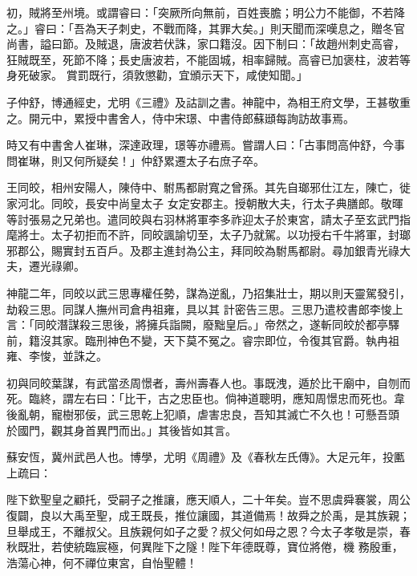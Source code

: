 \begin{pinyinscope}
 初，賊將至州境。或謂睿曰：「突厥所向無前，百姓喪膽；明公力不能御，不若降之。」睿曰：「吾為天子刺史，不戰而降，其罪大矣。」則天聞而深嘆息之，贈冬官尚書，謚曰節。及賊退，唐波若伏誅，家口籍沒。因下制曰：「故趙州刺史高睿，狂賊既至，死節不降；長史唐波若，不能固城，相率歸賊。高睿已加褒柱，波若等身死破家。
 賞罰既行，須敦懲勸，宜頒示天下，咸使知聞。」



 子仲舒，博通經史，尤明《三禮》及詁訓之書。神龍中，為相王府文學，王甚敬重之。開元中，累授中書舍人，侍中宋璟、中書侍郎蘇頲每詢訪故事焉。



 時又有中書舍人崔琳，深達政理，璟等亦禮焉。嘗謂人曰：「古事問高仲舒，今事問崔琳，則又何所疑矣！」仲舒累遷太子右庶子卒。



 王同皎，相州安陽人，陳侍中、駙馬都尉寬之曾孫。其先自瑯邪仕江左，陳亡，徙家河北。同皎，長安中尚皇太子
 女定安郡主。授朝散大夫，行太子典膳郎。敬暉等討張易之兄弟也。遣同皎與右羽林將軍李多祚迎太子於東宮，請太子至玄武門指麾將士。太子初拒而不許，同皎諷諭切至，太子乃就駕。以功授右千牛將軍，封瑯邪郡公，賜實封五百戶。及郡主進封為公主，拜同皎為駙馬都尉。尋加銀青光祿大夫，遷光祿卿。



 神龍二年，同皎以武三思專權任勢，謀為逆亂，乃招集壯士，期以則天靈駕發引，劫殺三思。同謀人撫州司倉冉祖雍，具以其
 計密告三思。三思乃遣校書郎李悛上言：「同皎潛謀殺三思後，將擁兵詣闕，廢黜皇后。」帝然之，遂斬同皎於都亭驛前，籍沒其家。臨刑神色不變，天下莫不冤之。睿宗即位，令復其官爵。執冉祖雍、李悛，並誅之。



 初與同皎葉謀，有武當丞周憬者，壽州壽春人也。事既洩，遁於比干廟中，自刎而死。臨終，謂左右曰：「比干，古之忠臣也。倘神道聰明，應知周憬忠而死也。韋後亂朝，寵樹邪佞，武三思乾上犯順，虐害忠良，吾知其滅亡不久也！可懸吾頭
 於國門，觀其身首異門而出。」其後皆如其言。



 蘇安恆，冀州武邑人也。博學，尤明《周禮》及《春秋左氏傳》。大足元年，投匭上疏曰：



 陛下欽聖皇之顧托，受嗣子之推讓，應天順人，二十年矣。豈不思虞舜褰裳，周公復闢，良以大禹至聖，成王既長，推位讓國，其道備焉！故舜之於禹，是其族親；旦舉成王，不離叔父。且族親何如子之愛？叔父何如母之恩？今太子孝敬是崇，春秋既壯，若使統臨宸極，何異陛下之隧！陛下年德既尊，寶位將倦，機
 務殷重，浩蕩心神，何不禪位東宮，自怡聖體！




\end{pinyinscope}

